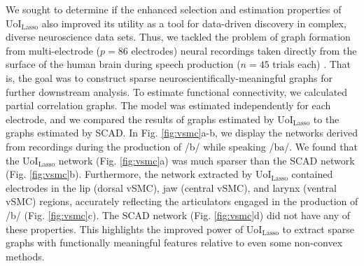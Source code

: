 \documentclass[letterpaper, 10 pt, conference]{ieeeconf}  %
\begin{document}
We sought to determine if the enhanced selection and estimation properties of UoI$_{\text{Lasso}}$ also improved its utility as a tool for data-driven discovery in complex, diverse neuroscience data sets. Thus, we tackled the problem of graph formation from multi-electrode ($p=86$ electrodes) neural recordings taken directly from the surface of the human brain during speech production ($n=45$ trials each) \cite{bouchard2013}. That is, the goal was to construct sparse neuroscientifically-meaningful graphs for further downstream analysis. To estimate functional connectivity, we calculated partial correlation graphs. The model was estimated independently for each electrode, and we compared the results of graphs estimated by UoI$_{\text{Lasso}}$ to the graphs estimated by SCAD. In Fig. \ref{fig:vsmc}a-b, we display the networks derived from recordings during the production of /b/ while speaking /ba/. We found that the UoI$_{\text{Lasso}}$ network (Fig. \ref{fig:vsmc}a) was much sparser than the SCAD network (Fig. \ref{fig:vsmc}b). Furthermore, the network extracted by UoI$_{\text{Lasso}}$ contained electrodes in the lip (dorsal vSMC), jaw (central vSMC), and larynx (ventral vSMC) regions, accurately reflecting the articulators engaged in the production of /b/ (Fig. \ref{fig:vsmc}c). The SCAD network (Fig. \ref{fig:vsmc}d) did not have any of these properties. This highlights the improved power of UoI$_{\text{Lasso}}$ to extract sparse graphs with functionally meaningful features relative to even some non-convex methods.
\end{document}
